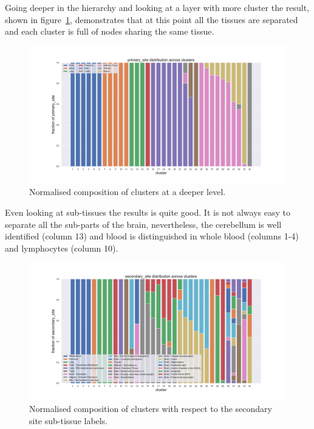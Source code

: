 Going deeper in the hierarchy and looking at a layer with more cluster the result, shown in figure~\ref{fig:topic/gtex/oversigma_10tissue/fraction_clustercomposition_l2_primary_site}, demonstrates that at this point all the tissues are separated and each cluster is full of nodes sharing the same tissue.
\begin{figure}[htb!]
    \centering
    \includegraphics[width=0.9\linewidth]{pictures/topic/gtex/oversigma_10tissue/fraction_clustercomposition_l2_primary_site.pdf}
    \caption{Normalised composition of clusters at a deeper level.}
    \label{fig:topic/gtex/oversigma_10tissue/fraction_clustercomposition_l2_primary_site}
\end{figure}
Even looking at sub-tissues the results is quite good. It is not always easy to separate all the sub-parts of the brain, nevertheless, the cerebellum is well identified (column 13) and blood is distinguished in whole blood (columns 1-4) and lymphocytes (column 10).
\begin{figure}[htb!]
    \centering
    \includegraphics[width=0.9\linewidth]{pictures/topic/gtex/oversigma_10tissue/fraction_clustercomposition_l2_secondary_site.pdf}
    \caption{Normalised composition of clusters with respect to the secondary site sub-tissue labels.}
    \label{fig:topic/gtex/oversigma_10tissue/fraction_clustercomposition_l2_secondary_site}
\end{figure}

